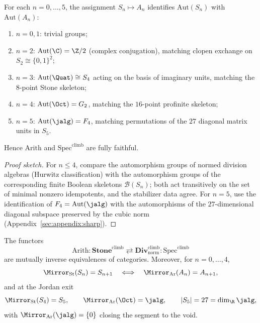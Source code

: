 \begin{lemma}\label{lem:void-mirror:aut}
For each $n=0,\ldots,5$, the assignment $S_n\mapsto A_n$ identifies
$\mathrm{Aut}(S_n)$ with $\mathrm{Aut}(A_n)$:
\begin{enumerate}[label=(\roman*),leftmargin=*]
  \item $n=0,1$: trivial groups;
  \item $n=2$: $\mathrm{Aut}(\C)=\Z/2$ (complex conjugation), matching clopen
    exchange on $S_2\cong\{0,1\}^2$;
  \item $n=3$: $\mathrm{Aut}(\Quat)\cong S_4$ acting on the basis of imaginary
    units, matching the $8$-point Stone skeleton;
  \item $n=4$: $\mathrm{Aut}(\Oct)=G_2$, matching the $16$-point profinite
    skeleton;
  \item $n=5$: $\mathrm{Aut}(\jalg)=F_4$, matching permutations of the $27$
    diagonal matrix units in $S_5$.
\end{enumerate}
Hence $\mathrm{Arith}$ and $\mathrm{Spec}^{\mathrm{climb}}$ are fully faithful.
\end{lemma}

\begin{proof}[Proof sketch]
For $n\leq4$, compare the automorphism groups of normed division algebras
(Hurwitz classification) with the automorphism groups of the corresponding
finite Boolean skeletons $\mathcal{B}(S_n)$; both act transitively on the set of
minimal nonzero idempotents, and the stabilizer data agree. For $n=5$, use the
identification of $F_4=\mathrm{Aut}(\jalg)$ with the automorphisms of the
$27$-dimensional diagonal subspace preserved by the cubic norm
(Appendix~\ref{sec:appendix:sharp}).
\end{proof}

\begin{theorem}\label{thm:void-mirror:equiv}
The functors
\[
  \mathrm{Arith}:\mathbf{Stone}^{\mathrm{climb}}\rightleftarrows
  \mathbf{Div}^{\mathrm{climb}}_{\mathrm{norm}}:
  \mathrm{Spec}^{\mathrm{climb}}
\]
are mutually inverse equivalences of categories. Moreover, for $n=0,\ldots,4$,
\[
  \Mirror_{\mathrm{St}}(S_n)=S_{n+1}
  \quad\Longleftrightarrow\quad
  \Mirror_{\mathrm{Ar}}(A_n)=A_{n+1},
\]
and at the Jordan exit
\[
  \Mirror_{\mathrm{St}}(S_4)=S_5,\qquad
  \Mirror_{\mathrm{Ar}}(\Oct)=\jalg,\qquad
  |S_5|=27=\dim_{\R}\jalg,
\]
with $\Mirror_{\mathrm{Ar}}(\jalg)=\{0\}$ closing the segment to the void.
\end{theorem}

